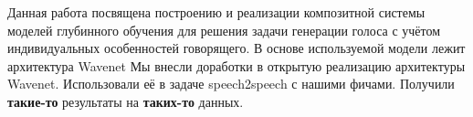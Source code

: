 \documentclass[../diploma.tex]{subfiles}
\begin{document}
    Данная работа посвящена построению и реализации композитной системы моделей глубинного обучения
    для решения задачи генерации голоса с учётом индивидуальных особенностей говорящего.
    В основе используемой модели лежит архитектура Wavenet \cite{bakshi1993wave}
    Мы внесли доработки в открытую реализацию архитектуры Wavenet. Использовали её в
    задаче speech2speech с нашими фичами. Получили \textbf{такие-то} результаты на
    \textbf{таких-то} данных.
\end{document}

